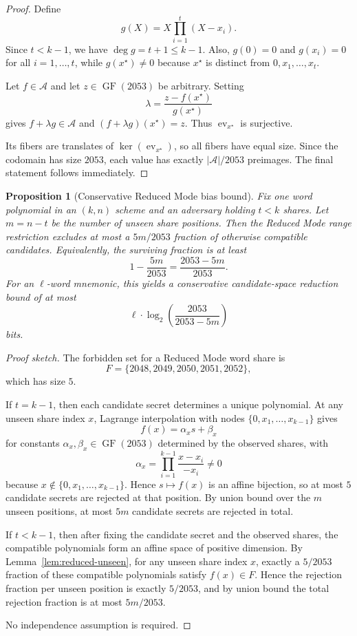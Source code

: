 \documentclass[11pt]{article}
\newcommand{\GF}{\operatorname{GF}}
\newtheorem{proposition}[theorem]{Proposition}
\begin{document}
\begin{proof}
Define
\[
    g(X) = X \prod_{i=1}^{t} (X - x_i).
\]
Since $t < k - 1$, we have $\deg g = t + 1 \leq k - 1$. Also, $g(0) = 0$ and $g(x_i) = 0$ for all $i = 1, \ldots, t$, while $g(x^\star) \neq 0$ because $x^\star$ is distinct from $0, x_1, \ldots, x_t$.

Let $f \in \mathcal{A}$ and let $z \in \GF(2053)$ be arbitrary. Setting
\[
    \lambda = \frac{z - f(x^\star)}{g(x^\star)}
\]
gives $f + \lambda g \in \mathcal{A}$ and $(f + \lambda g)(x^\star) = z$. Thus $\operatorname{ev}_{x^\star}$ is surjective.

Its fibers are translates of $\ker(\operatorname{ev}_{x^\star})$, so all fibers have equal size. Since the codomain has size $2053$, each value has exactly $|\mathcal{A}|/2053$ preimages. The final statement follows immediately.
\end{proof}

\begin{proposition}[Conservative Reduced Mode bias bound]
\label{prop:reduced}
Fix one word polynomial in an $(k,n)$ scheme and an adversary holding $t < k$ shares. Let $m = n - t$ be the number of unseen share positions. Then the Reduced Mode range restriction excludes at most a $5m/2053$ fraction of otherwise compatible candidates. Equivalently, the surviving fraction is at least
\[
    1 - \frac{5m}{2053} = \frac{2053 - 5m}{2053}.
\]
For an $\ell$-word mnemonic, this yields a conservative candidate-space reduction bound of at most
\[
    \ell \cdot \log_2\!\left(\frac{2053}{2053 - 5m}\right)
\]
bits.
\end{proposition}

\begin{proof}[Proof sketch]
The forbidden set for a Reduced Mode word share is
\[
    F = \{2048, 2049, 2050, 2051, 2052\},
\]
which has size $5$.

If $t = k - 1$, then each candidate secret determines a unique polynomial. At any unseen share index $x$, Lagrange interpolation with nodes $\{0, x_1, \ldots, x_{k-1}\}$ gives
\[
    f(x) = \alpha_x s + \beta_x
\]
for constants $\alpha_x, \beta_x \in \GF(2053)$ determined by the observed shares, with
\[
    \alpha_x = \prod_{i=1}^{k-1} \frac{x - x_i}{-x_i} \neq 0
\]
because $x \notin \{0, x_1, \ldots, x_{k-1}\}$. Hence $s \mapsto f(x)$ is an affine bijection, so at most $5$ candidate secrets are rejected at that position. By union bound over the $m$ unseen positions, at most $5m$ candidate secrets are rejected in total.

If $t < k - 1$, then after fixing the candidate secret and the observed shares, the compatible polynomials form an affine space of positive dimension. By Lemma~\ref{lem:reduced-unseen}, for any unseen share index $x$, exactly a $5/2053$ fraction of these compatible polynomials satisfy $f(x) \in F$. Hence the rejection fraction per unseen position is exactly $5/2053$, and by union bound the total rejection fraction is at most $5m/2053$.

No independence assumption is required.
\end{proof}
\end{document}
